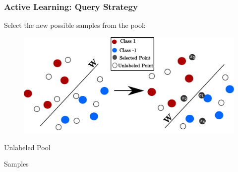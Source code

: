 \documentclass[11pts]{beamer}
\begin{document}
\begin{frame}%
\frametitle{Active Learning: Query Strategy}


Select the new  possible samples from the pool:
\vspace*{0.5cm}


\begin{figure}
  \begin{center}
    \includegraphics[scale=0.39]{IM/SELECTION_P.pdf}
  \end{center}
\end{figure}
\begin{minipage}{0.45\textwidth}
\centering
Unlabeled Pool
\end{minipage}
\hfill
\begin{minipage}{0.52\textwidth}
\centering
 \hspace{1.25cm}Samples
\end{minipage}
\end{frame}
\end{document}
